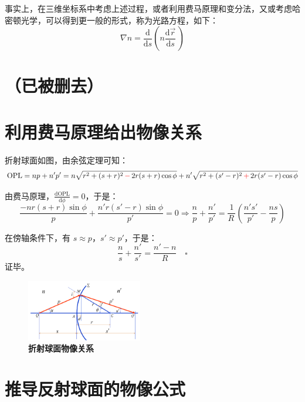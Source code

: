 \documentclass[UTF8]{report}
\theoremstyle{MyLineTheoremStyle} %
\theoremstyle{MyBlockTheoremStyle} %
\theoremstyle{MySubsubsectionStyle} %
\begin{document}
事实上，在三维坐标系中考虑上述过程，或者利用费马原理和变分法，又或考虑哈密顿光学，可以得到更一般的形式，称为光路方程，如下：
\begin{equation}
    \nabla n=\frac{\mathrm{d}}{\mathrm{d}s}\left(n\frac{\mathrm{d}\vec{r}}{\mathrm{d}s}\,\right)
\end{equation}

\section{（已被删去）}
\section{利用费马原理给出物像关系}

折射球面如图，由余弦定理可知：
\begin{equation}
\text{OPL} = np + n'p' 
= n \sqrt{r^2 + (s+r)^2 \,{\color{red} -}\, 2r(s+r)\cos \phi } + n' \sqrt{r^2 + (s'-r)^2 \,{\color{red} +}\, 2r(s'-r)\cos \phi } 
\end{equation}

由费马原理，$\frac{\mathrm{d} \text{OPL}  }{\mathrm{d} \phi } = 0$，于是：
\begin{equation}
\frac{-nr(s+r)\sin \phi }{p} + \frac{n'r(s'-r)\sin \phi }{p'} = 0 \Longrightarrow  \frac{n}{p} + \frac{n'}{p'} = \frac{1}{R\,}\left( \frac{n's'}{p'} - \frac{ns}{p} \right)
\end{equation}

在傍轴条件下，有 $s \approx p$，$s' \approx p'$，于是：
\begin{equation}
\frac{n}{s} + \frac{n'}{s'} = \frac{n' - n}{R}   \quad\square
\end{equation}
证毕。
\begin{figure}[H]\centering
\includegraphics[width=0.45\textwidth]{assets/1/7dd67844c3c8000268c32546583de193.png}
\caption{\textbf{折射球面物像关系}}\label{折射球面物像关系}
\end{figure}

\section{推导反射球面的物像公式}
\end{document}
